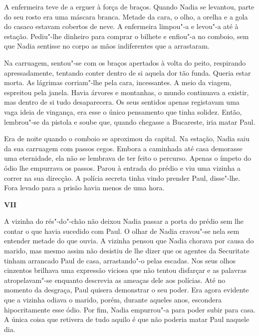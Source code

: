 A enfermeira teve de a erguer à força de braços. Quando Nadia se
levantou, parte do seu rosto era uma máscara branca. Metade da cara, o
olho, a orelha e a gola do casaco estavam cobertos de neve. A enfermeira
limpou"-a e levou"-a até à estação. Pediu"-lhe dinheiro para comprar o
bilhete e enfiou"-a no comboio, sem que Nadia sentisse no corpo as mãos
indiferentes que a arrastaram.

Na carruagem, sentou"-se com os braços apertados à volta do peito,
respirando apressadamente, tentando conter dentro de si aquela dor tão
funda. Queria estar morta. As lágrimas corriam"-lhe pela cara,
incessantes. A meio da viagem, espreitou pela janela. Havia árvores e
montanhas, o mundo continuava a existir, mas dentro de si tudo desaparecera. Os seus sentidos apenas registavam uma vaga ideia de vingança,
era esse o único pensamento que tinha solidez. Então, lembrou"-se da
pistola e soube que, quando chegasse a Bucareste, iria matar Paul.

Era de noite quando o comboio se aproximou da capital. Na estação, Nadia
saiu da sua carruagem com passos cegos. Embora a caminhada até casa
demorasse uma eternidade, ela não se lembrava de ter feito o percurso.
Apenas o ímpeto do ódio lhe empurrava os passos. Parou à entrada do
prédio e viu uma vizinha a correr na sua direcção. A polícia secreta
tinha vindo prender Paul, disse"-lhe. Fora levado para a prisão havia
menos de uma hora.

\pagebreak
\vspace*{1.8cm}
\noindent{}\textbf{VII}

\bigskip

A vizinha do rés"-do"-chão não deixou Nadia passar a porta do prédio sem
lhe contar o que havia sucedido com Paul. O olhar de Nadia cravou"-se
nela sem entender metade do que ouvia. A vizinha pensou que Nadia
chorava por causa do marido, mas mesmo assim não desistiu de lhe dizer
que os agentes da Securitate tinham arrancado Paul de casa, arrastando"-o
pelas escadas. Nos seus olhos cinzentos brilhava uma expressão viciosa
que não tentou disfarçar e as palavras atropelavam"-se enquanto
descrevia as ameaças dele aos polícias. Até no momento da desgraça, Paul
quisera demonstrar o seu poder. Era agora evidente que a vizinha odiava
o marido, porém, durante aqueles anos, escondera hipocritamente esse
ódio. Por fim, Nadia empurrou"-a para poder subir para casa. A única
coisa que retivera de tudo aquilo é que não poderia matar Paul naquele
dia.

